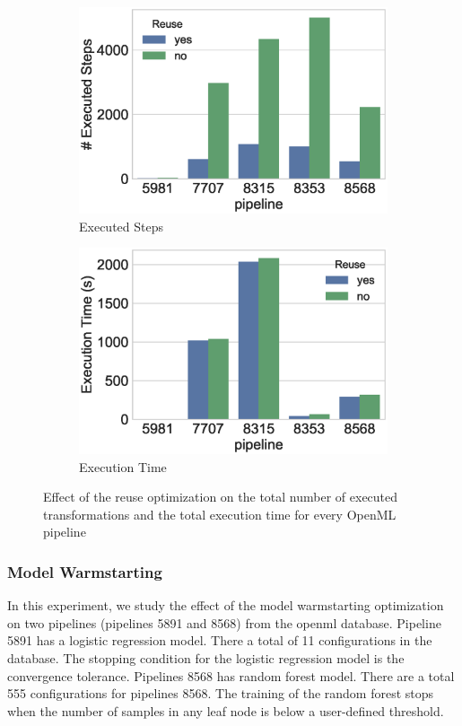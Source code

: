 \begin{figure}
\centering
\begin{subfigure}{.5\linewidth}
  \includegraphics[width=\linewidth]{../images/experiment-results/reuse-openml-steps.eps}
  \caption{Executed Steps}
  \label{fig:sub1}
\end{subfigure}%
\begin{subfigure}{.5\linewidth}
  \includegraphics[width=\linewidth]{../images/experiment-results/reuse-openml-time.eps}
  \caption{Execution Time}
  \label{fig:sub1}
\end{subfigure}
\caption{Effect of the reuse optimization on the total number of executed transformations and the total execution time for every OpenML pipeline}
\label{evaluation-reuse-open-figure}
\end{figure}

\subsubsection{Model Warmstarting}
In this experiment, we study the effect of the model warmstarting optimization on two pipelines (pipelines 5891 and 8568) from the openml database.
Pipeline 5891 has a logistic regression model.
There a total of 11 configurations in the database.
The stopping condition for the logistic regression model is the convergence tolerance.
Pipelines 8568 has random forest model.
There are a total 555 configurations for pipelines 8568.
The training of the random forest stops when the number of samples in any leaf node is below a user-defined threshold.

